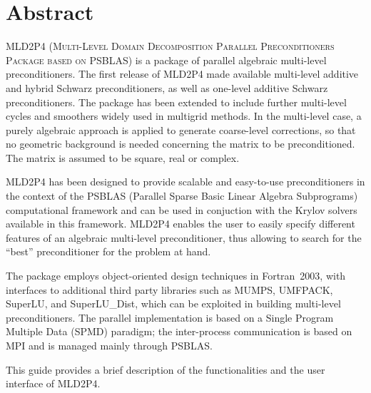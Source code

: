 \section*{Abstract}
\textsc{MLD2P4 (Multi-Level Domain Decomposition Parallel Preconditioners Package
based on PSBLAS}) is a package of parallel algebraic multi-level preconditioners.
The first release of MLD2P4 made available multi-level additive and hybrid Schwarz
preconditioners, as well as one-level additive Schwarz preconditioners. The package
has been extended to include further multi-level cycles and smoothers widely used in
multigrid methods. In the multi-level case, a purely algebraic approach is applied to
generate coarse-level corrections, so that no geometric background is needed
concerning the matrix to be preconditioned. The matrix is assumed to be square,
real or complex. 

MLD2P4 has been designed to provide scalable and easy-to-use preconditioners
in the context of the PSBLAS (Parallel Sparse Basic Linear Algebra Subprograms)
computational framework and can be used in conjuction with the Krylov solvers
available in this framework. MLD2P4 enables the user to easily specify different
features of an algebraic multi-level preconditioner, thus allowing to search
for the ``best'' preconditioner for the problem at hand. 

The package employs object-oriented design techniques in
Fortran~2003, with interfaces to additional third party libraries 
such as MUMPS, UMFPACK, SuperLU, and SuperLU\_Dist, which
can be exploited in building multi-level preconditioners. The parallel
implementation is based on a Single Program Multiple Data (SPMD)
paradigm; the inter-process communication is based on MPI and
is managed mainly through PSBLAS.

This guide provides a brief description of the functionalities and
the user interface of MLD2P4.
